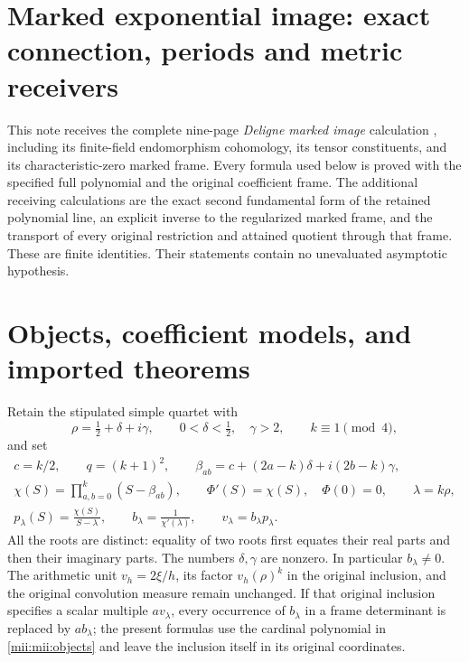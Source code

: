 \documentclass[11pt,a4paper]{article}
\begin{document}
\setcounter{equation}{0}
\renewcommand{\theequation}{MII.\arabic{equation}}
\section*{Marked exponential image: exact connection, periods and metric receivers}



This note receives the complete nine-page \emph{Deligne marked image} calculation
\cite{mii:received}, including its finite-field endomorphism cohomology, its tensor
constituents, and its characteristic-zero marked frame. Every formula used below
is proved with the specified full polynomial and the original coefficient frame.
The additional receiving calculations are the exact second fundamental form of
the retained polynomial line, an explicit inverse to the regularized marked
frame, and the transport of every original restriction and attained quotient
through that frame. These are finite identities. Their statements contain no
unevaluated asymptotic hypothesis.

\section{Objects, coefficient models, and imported theorems}
Retain the stipulated simple quartet with
\[
 \rho=\tfrac12+\delta+i\gamma,\qquad 0<\delta<\tfrac12,\quad\gamma>2,
 \qquad k\equiv1\pmod4,
\]
and set
\begin{equation}\tag{MII1}\label{mii:mii:objects}
 \begin{gathered}
 c=k/2,\qquad q=(k+1)^2,\qquad
 \beta_{ab}=c+(2a-k)\delta+i(2b-k)\gamma,\\
 \chi(S)=\prod_{a,b=0}^k(S-\beta_{ab}),\qquad
 \Phi'(S)=\chi(S),\quad\Phi(0)=0,\qquad\lambda=k\rho,\\
 p_\lambda(S)=\frac{\chi(S)}{S-\lambda},\qquad
 b_\lambda=\frac1{\chi'(\lambda)},\qquad v_\lambda=b_\lambda p_\lambda.
 \end{gathered}
\end{equation}
All the roots are distinct: equality of two roots first equates their real
parts and then their imaginary parts. The numbers $\delta,\gamma$ are nonzero.
In particular $b_\lambda\ne0$. The arithmetic unit $v_h=2\xi/h$, its factor
$v_h(\rho)^k$ in the original inclusion, and the original convolution measure
remain unchanged. If that original inclusion specifies a scalar multiple
$a v_\lambda$, every occurrence of $b_\lambda$ in a frame determinant is replaced
by $a b_\lambda$; the present formulas use the cardinal polynomial in
\eqref{mii:mii:objects} and leave the inclusion itself in its original coordinates.
\end{document}

